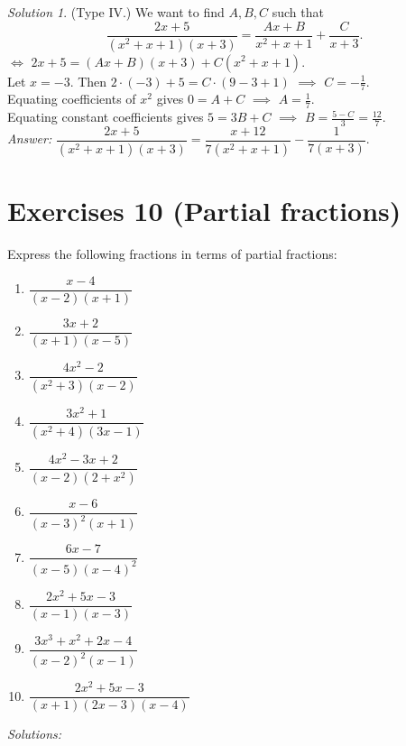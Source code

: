 \documentclass[
  english,
  12pt,
  oneside]{book}
\providecommand{\tightlist}{%
  \setlength{\itemsep}{0pt}\setlength{\parskip}{0pt}}
\theoremstyle{definition}
\theoremstyle{definition}
\theoremstyle{definition}
\theoremstyle{definition}
\theoremstyle{remark}
\newtheorem*{solution}{Solution}
\begin{document}
\begin{solution}
(Type IV.) We want to find \(A,B,C\) such that
\[\dfrac{2x+5}{(x^2+x+1)(x+3)}=\dfrac{Ax+B}{x^2+x+1}+\dfrac{C}{x+3}.\]
\(\iff\) \(2x+5=(Ax+B)(x+3)+C(x^2+x+1)\).\\
Let \(x=-3\). Then \(2\cdot(-3)+5=C\cdot(9-3+1)\) \(\implies\) \(C=-\frac17\).\\
Equating coefficients of \(x^2\) gives \(0=A+C\) \(\implies\) \(A=\frac17\).\\
Equating constant coefficients gives \(5=3B+C\) \(\implies\) \(B=\frac{5-C}{3}=\frac{12}7\).\\
\emph{Answer:}
\(\dfrac{2x+5}{(x^2+x+1)(x+3)}=\dfrac{x+12}{7(x^2+x+1)}-\dfrac{1}{7(x+3)}.\)
\end{solution}

\chapter*{Exercises 10 (Partial fractions)}\label{exercises-10-partial-fractions}

Express the following fractions in terms of partial fractions:

\begin{enumerate}
\def\labelenumi{\roman{enumi})}
\tightlist
\item
  \(\dfrac{x-4}{(x-2)(x+1)}\)
\item
  \(\dfrac{3x+2}{(x+1)(x-5)}\)
\item
  \(\dfrac{4x^2-2}{(x^2+3)(x-2)}\)
\item
  \(\dfrac{3x^2+1}{(x^2+4)(3x-1)}\)
\item
  \(\dfrac{4x^2-3x+2}{(x-2)(2+x^2)}\)
\item
  \(\dfrac{x-6}{(x-3)^2(x+1)}\)
\item
  \(\dfrac{6x-7}{(x-5)(x-4)^2}\)
\item
  \(\dfrac{2x^2+5x-3}{(x-1)(x-3)}\)
\item
  \(\dfrac{3x^3+x^2+2x-4}{(x-2)^2(x-1)}\)
\item
  \(\dfrac{2x^2+5x-3}{(x+1)(2x-3)(x-4)}\)
\end{enumerate}

\emph{Solutions:}
\end{document}
